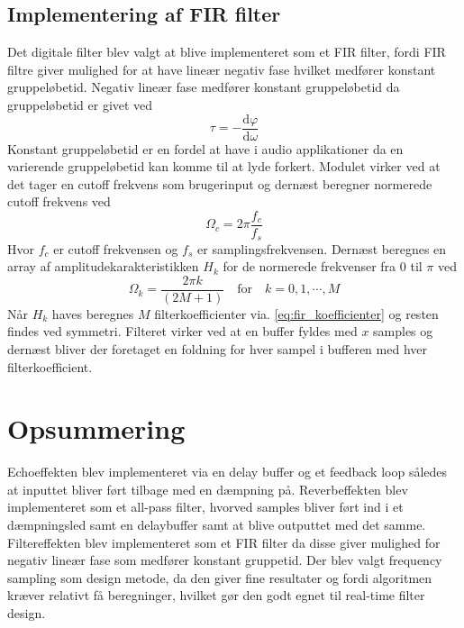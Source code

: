\subsection{Implementering af FIR filter}
Det digitale filter blev valgt at blive implementeret som et FIR filter, fordi FIR filtre giver mulighed for at have lineær negativ fase hvilket medfører konstant gruppeløbetid.\newline
Negativ lineær fase medfører konstant gruppeløbetid da gruppeløbetid er givet ved
\[
\tau = -\frac{\mathrm{d}\varphi}{\mathrm{d}\omega}
\]
Konstant gruppeløbetid er en fordel at have i audio applikationer da en varierende gruppeløbetid kan komme til at lyde forkert.\newline
Modulet virker ved at det tager en cutoff frekvens som brugerinput og dernæst beregner normerede cutoff frekvens ved
\[ \Omega_c = 2\pi\frac{f_c}{f_s} \]
Hvor $f_c$ er cutoff frekvensen og $f_s$ er samplingsfrekvensen.
Dernæst beregnes en array af amplitudekarakteristikken $H_k$ for de normerede frekvenser fra $0$ til $\pi$ ved 
\[ \Omega_k = \frac{2\pi k}{(2M + 1)} \quad \mathrm{for} \quad k = 0, 1, \cdots, M \]
Når $H_k$ haves beregnes $M$ filterkoefficienter via. \ref{eq:fir_koefficienter} og resten findes ved symmetri.\newline
Filteret virker ved at en buffer fyldes med $x$ samples og dernæst bliver der foretaget en foldning for hver sampel i bufferen med hver filterkoefficient.

\section{Opsummering}
Echoeffekten blev implementeret via en delay buffer og et feedback loop således at inputtet bliver ført tilbage med en dæmpning på.\newline
Reverbeffekten blev implementeret som et all-pass filter, hvorved samples bliver ført ind i et dæmpningsled samt en delaybuffer samt at blive outputtet med det samme.
Filtereffekten blev implementeret som et FIR filter da disse giver mulighed for negativ lineær fase som medfører konstant gruppetid.
Der blev valgt frequency sampling som design metode, da den giver fine resultater og fordi algoritmen kræver relativt få beregninger, hvilket gør den godt egnet til real-time filter design.
